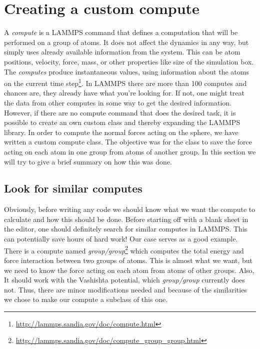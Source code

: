 \documentclass[twoside,english]{uiofysmaster}
\begin{document}
\section{Creating a custom compute} \label{sec:customCompute}
A \textit{compute} is a LAMMPS command that defines a computation that will be performed on a group of atoms. 
It does not affect the dynamics in any way, but simply uses already available information from the system. 
This can be atom positions, velocity, force, mass, or other properties like size of the simulation box.
The \textit{computes} produce instantaneous values, using information about the atoms on the current time step\footnote{\href{ http://lammps.sandia.gov/doc/compute.html}{ http://lammps.sandia.gov/doc/compute.html}}.
In LAMMPS there are more than 100 computes and chances are, they already have what you're looking for. If not, one might treat the data from other computes in some way to get the desired information. However, if there are no compute command that does the desired task, it is possible to create an own custom class and thereby expanding the LAMMPS library.  
In order to compute the normal forces acting on the sphere, we have written a custom compute class. 
The objective was for the class to save the force acting on each atom in one group from atoms of another group. 
In this section we will try to give a brief summary on how this was done.


\subsection{Look for similar computes}
Obviously, before writing any code we should know what we want the compute to calculate and how this should be done. 
Before starting off with a blank sheet in the editor, one should definitely search for similar computes in LAMMPS. This can potentially save hours of hard work!
Our case serves as a good example.
There is a compute named \textit{group/group}\footnote{\href{http://lammps.sandia.gov/doc/compute_group_group.html}{http://lammps.sandia.gov/doc/compute\_group\_group.html}} which computes the total energy and force interaction between two groups of atoms. 
This is almost what we want, but we need to know the force acting on each atom from atoms of other groups. 
Also, It should work with the Vashishta potential, which \textit{group/group} currently does not.
Thus, there are minor modifications needed and because of the similarities we chose to make our compute a subclass of this one.
\end{document}
